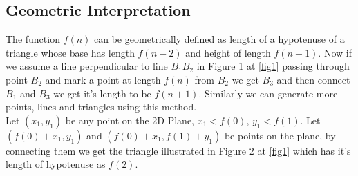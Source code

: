 \documentclass{article}
\begin{document}
\subsection{Geometric Interpretation}
\label{geo}
The function $f(n)$ can be geometrically defined as length of a hypotenuse of a triangle whose base has length $f(n - 2)$ and height of length $f(n - 1)$. Now if we assume a line perpendicular to line $B_1B_2$ in Figure 1 at \ref{fig1} passing through point $B_2$ and mark a point at length $f(n)$ from $B_2$ we get $B_3$ and then connect $B_1$ and $B_3$ we get it's length to be $f(n + 1)$. Similarly we can generate more points, lines and triangles using this method.\\ Let $(x_1, y_1)$ be any point on the 2D Plane, $x_1 < f(0)$, $y_1 < f(1)$. Let $(f(0) + x_1, y_1)$ and $(f(0) + x_1, f(1) + y_1)$ be points on the plane, by connecting them we get the triangle illustrated in Figure 2 at \ref{fig1} which has it's length of hypotenuse as $f(2)$.\\
\end{document}

